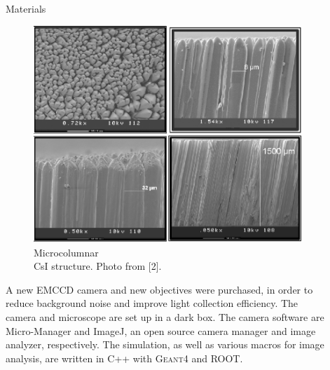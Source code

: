 \documentclass[final]{beamer}
\newlength{\sepwid}
\newlength{\onecolwid}
\newlength{\twocolwid}
\begin{document}
\begin{frame}[t]
\begin{columns}[t]
\begin{column}{\onecolwid}

\end{column} %

\begin{column}{\sepwid}\end{column} %

\begin{column}{\twocolwid} %

\begin{columns}[t,totalwidth=\twocolwid] %

\begin{column}{\onecolwid}\vspace{-.6in} %


\begin{block}{Materials}

\begin{figure}
	\centering
	\includegraphics[width=0.8\linewidth]{csi.png}
    \caption{Microcolumnar \\CsI structure. Photo from [2].}
    \vspace{-40pt}
    \label{fig:csi_struct}
\end{figure}

A new EMCCD camera and new objectives were purchased, in order to reduce background noise and improve light collection efficiency. The camera and microscope are set up in a dark box. The camera software are Micro-Manager and ImageJ, an open source camera manager and image analyzer, respectively. The simulation, as well as various macros for image analysis, are written in C++ with \textsc{Geant}4 and ROOT.


\end{block}
\end{column}
\end{columns}
\end{column}
\end{columns}
\end{frame}
\end{document}
